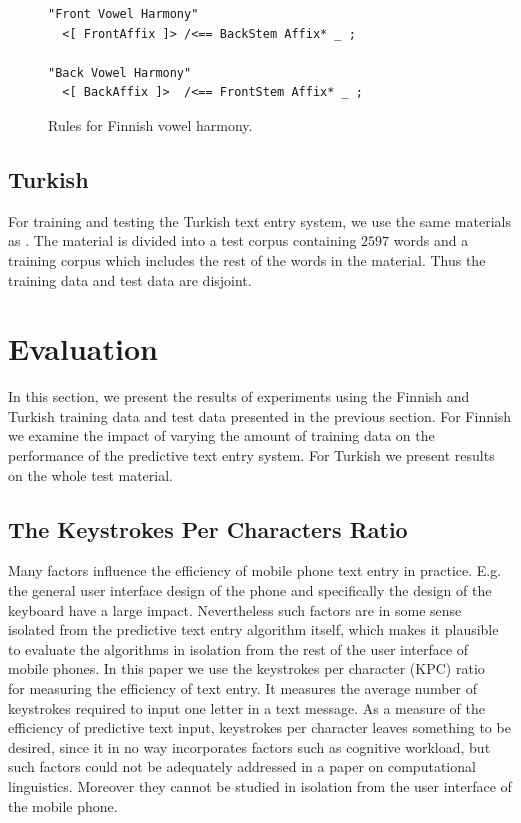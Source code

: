\documentclass{llncs}
\begin{document}
\begin{figure}
\begin{verbatim}
"Front Vowel Harmony"
  <[ FrontAffix ]> /<== BackStem Affix* _ ; 

"Back Vowel Harmony"
  <[ BackAffix ]>  /<== FrontStem Affix* _ ; 
\end{verbatim}
\caption{Rules for Finnish vowel harmony.}\label{fi-constraints}
\end{figure}

\subsection{Turkish}

For training and testing the Turkish text entry system, we use the
same materials as \cite{Tantug:2010}. The material is divided into a
test corpus containing $2597$ words and a training corpus which
includes the rest of the words in the material. Thus the training data
and test data are disjoint.

\section{Evaluation}\label{evaluation}

In this section, we present the results of experiments using the
Finnish and Turkish training data and test data presented in the
previous section. For Finnish we examine the impact of varying the
amount of training data on the performance of the predictive text
entry system. For Turkish we present results on the whole test
material.

\subsection{The Keystrokes Per Characters Ratio}

Many factors influence the efficiency of mobile phone text entry in
practice. E.g. the general user interface design of the phone and
specifically the design of the keyboard have a large
impact. Nevertheless such factors are in some sense isolated from the
predictive text entry algorithm itself, which makes it plausible to
evaluate the algorithms in isolation from the rest of the user
interface of mobile phones. In this paper we use the keystrokes per
character (KPC) ratio~\cite{MacKenzie02kspc} for measuring the
efficiency of text entry. It measures the average number of keystrokes
required to input one letter in a text message. As a measure of the
efficiency of predictive text input, keystrokes per character leaves
something to be desired, since it in no way incorporates factors such
as cognitive workload, but such factors could not be adequately
addressed in a paper on computational linguistics. Moreover they
cannot be studied in isolation from the user interface of the mobile
phone.
\end{document}
